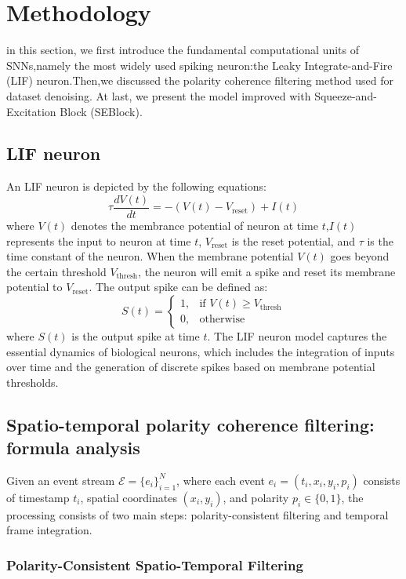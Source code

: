 \documentclass[conference]{IEEEtran}
\begin{document}
\section{Methodology}
in this section, we first introduce the fundamental computational units of SNNs,namely the most widely used spiking neuron:the Leaky Integrate-and-Fire (LIF) neuron\cite{10.5555/2728336.2728412}.Then,we discussed the polarity coherence filtering method used for dataset denoising. At last, we present the model improved with Squeeze-and-Excitation Block (SEBlock).\cite{hu2019}
\subsection{LIF neuron}
An LIF neuron is depicted by the following equations:
\begin{equation}
\tau \frac{dV(t)}{dt} = -\left(V(t) - V_{\text{reset}}\right) + I(t)
\end{equation}
where $V(t)$ denotes the membrance potential of neuron at time $t$,$I(t)$ represents the input to neuron at time $t$, $V_{\text{reset}}$ is the reset potential, and $\tau$ is the time constant of the neuron. When the membrane potential $V(t)$ goes beyond the certain threshold $V_{\text{thresh}}$, the neuron will emit a spike and reset its membrane potential to $V_{\text{reset}}$. The output spike can be defined as:
\begin{equation}
S(t) = \begin{cases}
1, & \text{if } V(t) \geq V_{\text{thresh}} \\
0, & \text{otherwise}
\end{cases}
\end{equation}
where $S(t)$ is the output spike at time $t$. The LIF neuron model captures the essential dynamics of biological neurons, which includes the integration of inputs over time and the generation of discrete spikes based on membrane potential thresholds.
\subsection{Spatio-temporal polarity coherence filtering: formula analysis}
Given an event stream $\mathcal{E} = \{e_i\}_{i=1}^N$, where each event $e_i = (t_i, x_i, y_i, p_i)$ consists of timestamp $t_i$, spatial coordinates $(x_i, y_i)$, and polarity $p_i \in \{0, 1\}$, the processing consists of two main steps: polarity-consistent filtering and temporal frame integration.

\subsubsection{Polarity-Consistent Spatio-Temporal Filtering}
\end{document}
